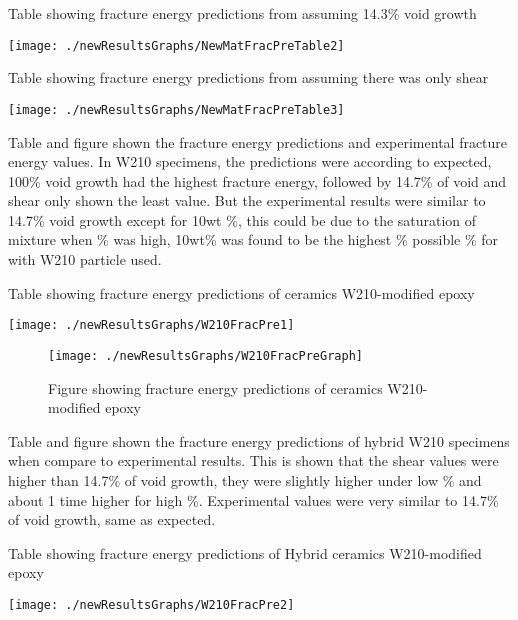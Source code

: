 \documentclass[numbers=noendperiod,chapterprefix=on]{icldt} %
\begin{document}
\begin{table}[!htpb]
\centering
\caption{Table showing fracture energy predictions from assuming 14.3\% void growth} %
\texttt{[image: ./newResultsGraphs/NewMatFracPreTable2]}
\end{table}
\FloatBarrier

\begin{table}[!htpb]
\centering
\caption{Table showing fracture energy predictions from assuming there was only shear} %
\texttt{[image: ./newResultsGraphs/NewMatFracPreTable3]}
\end{table}
\FloatBarrier

Table and figure shown the fracture energy predictions and experimental fracture energy values. In W210 specimens, the predictions were according to expected, 100\% void growth had the highest fracture energy, followed by 14.7\% of void and shear only shown the least value. But the experimental results were similar to 14.7\% void growth except for 10wt \%, this could be due to the saturation of mixture when \% was high, 10wt\% was found to be the highest \% possible \% for with W210 particle used.  

\begin{table}[!htpb]
\centering
\caption{Table showing fracture energy predictions of ceramics W210-modified epoxy} %
\texttt{[image: ./newResultsGraphs/W210FracPre1]}
\end{table}
\FloatBarrier

\begin{figure}[!t]
\centering
\texttt{[image: ./newResultsGraphs/W210FracPreGraph]}
\caption{Figure showing fracture energy predictions of ceramics W210-modified epoxy }
\end{figure}
\FloatBarrier

Table and figure shown the fracture energy predictions of hybrid W210 specimens when compare to experimental results. This is shown that the shear values were higher than 14.7\% of void growth, they were slightly higher under low \% and about 1 time higher for high \%. Experimental values were very similar to 14.7\% of void growth, same as expected. 

\begin{table}[!htpb]
\centering
\caption{Table showing fracture energy predictions of Hybrid ceramics W210-modified epoxy} %
\texttt{[image: ./newResultsGraphs/W210FracPre2]}
\end{table}
\FloatBarrier
\end{document}
